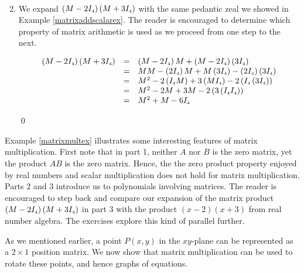 \begin{ex}
\begin{enumerate}
\[\begin{array}{rcl}
\end{array} \]

\item  We expand $\left(M - 2I_{\mbox{\tiny$4$}}\right)\left(M + 3I_{\mbox{\tiny$4$}}\right)$ with the same pedantic zeal we showed in Example \ref{matrixaddscalarex}. The reader is encouraged to determine which property of matrix arithmetic is used as we proceed from one step to the next.

\[\begin{array}{rcl}

\left(M - 2I_{\mbox{\tiny$4$}}\right)\left(M + 3I_{\mbox{\tiny$4$}}\right) & = & \left(M - 2I_{\mbox{\tiny$4$}}\right) M + \left(M - 2I_{\mbox{\tiny$4$}}\right)\left( 3I_{\mbox{\tiny$4$}}\right) \\
& = & MM - \left(2I_{\mbox{\tiny$4$}}\right)M + M\left( 3I_{\mbox{\tiny$4$}}\right) - \left( 2I_{\mbox{\tiny$4$}}\right)\left( 3I_{\mbox{\tiny$4$}}\right) \\
& = & M^2 -2 \left(I_{\mbox{\tiny$4$}}M\right) +3\left( M I_{\mbox{\tiny$4$}}\right) - 2\left( I_{\mbox{\tiny$4$}}\left( 3I_{\mbox{\tiny$4$}}\right)\right) \\
& = & M^2 - 2M  + 3M - 2\left(3\left( I_{\mbox{\tiny$4$}}I_{\mbox{\tiny$4$}}\right)\right) \\
& = & M^2 +M  - 6I_{\mbox{\tiny$4$}}  \\

\end{array}\]

\qed
\end{enumerate}

\end{ex}

Example \ref{matrixmultex} illustrates some interesting features of matrix multiplication.  First note that in part 1, neither $A$ nor $B$ is the zero matrix, yet the product $AB$ is the zero matrix.  Hence, the the zero product property enjoyed by real numbers and scalar multiplication does not hold for matrix multiplication. Parts 2 and 3 introduce us to polynomials involving matrices.  The reader is encouraged to step back and compare our expansion of the matrix product $\left(M - 2I_{\mbox{\tiny$4$}}\right)\left(M + 3I_{\mbox{\tiny$4$}}\right)$ in part 3 with the product $(x-2)(x+3)$ from real number algebra.  The exercises explore this kind of parallel further.  

\smallskip

As we mentioned earlier, a point $P(x,y)$ in the $xy$-plane can be represented as a $2 \times 1$ position matrix.  We now show that matrix multiplication can be used to rotate these points, and hence graphs of equations.

